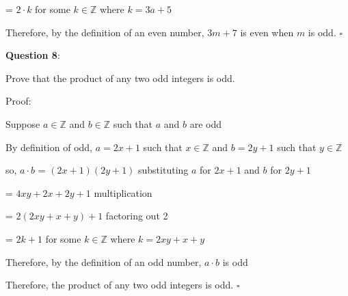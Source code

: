 \documentclass{article} %
\newcommand{\question}[2][]{\begin{flushleft}
        \textbf{Question #1}: \textit{#2}

\end{flushleft}}
\begin{document}
    \tabto*{1.75cm} = $2\cdot k$ for some $k \in \mathbb{Z}$ where $k = 3a + 5$

    Therefore, by the definition of an even number, $3m + 7$ is even when $m$ is odd. $\square$

    \newpage

    \question[8]{}

    Prove that the product of any two odd integers is odd.

    Proof:

    Suppose $a \in \mathbb{Z}$ and $b \in \mathbb{Z}$ such that $a$ and $b$ are odd

    By definition of odd, $a = 2x + 1$ such that $x \in \mathbb{Z}$ and $b = 2y + 1$ such that $y \in \mathbb{Z}$

    so, $a \cdot b$ = $(2x + 1)(2y + 1)$ substituting $a$ for $2x + 1$ and $b$ for $2y + 1$

    \tabto*{1.78cm} = $4xy + 2x + 2y + 1$ multiplication

    \tabto*{1.78cm} = $2(2xy + x + y) + 1$ factoring out 2

    \tabto*{1.78cm} = $2k + 1$ for some $k \in \mathbb{Z}$ where $k = 2xy + x + y$

    Therefore, by the definition of an odd number, $a \cdot b$ is odd

    Therefore, the product of any two odd integers is odd. $\square$



    
\end{document}
